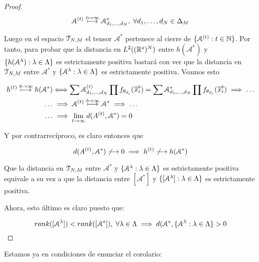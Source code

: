 \begin{proof}
    \begin{equation}
        \mathcal{A}^{(t)} \stackrel{t \mapsto \infty}{\longmapsto} \mathcal{A}^*_{d_1, \ldots, d_N},
        \; \forall d_1, \ldots, d_N \in \Delta_{M}
    \end{equation}

    Luego en el espacio $\mathcal{T}_{N, M}$ el tensor $\mathcal{A}^*$ pertenece al cierre de $\{ \mathcal{A}^{(t)}: t \in \mathbb{N} \}$. Por tanto, para probar que la distancia en $L^2((\mathbb{R}^s)^N)$ entre $h(\mathcal{A}^*)$ y $\{ h(\mathcal{A}^\lambda): \lambda \in \Lambda \}$ es estrictamente positiva bastará con ver que la distancia en $\mathcal{T}_{N, M}$ entre $\mathcal{A}^*$ y $\{ \mathcal{A}^\lambda: \lambda \in \Lambda \}$ es estrictamente positiva. Veamos esto

    \begin{equation}
    \begin{split}
        h^{(t)} \stackrel{t \mapsto \infty}{\longmapsto} h(\mathcal{A}^*) &\Longleftrightarrow \sum \mathcal{A}^{(t)}_{d_1, \ldots, d_N} \prod f_{\theta_{d_i}}(\overrightarrow{x_i}) = \sum \mathcal{A}^*_{d_1, \ldots, d_N} \prod f_{\theta_{d_i}}(\overrightarrow{x_i}) \implies \ldots \\
        \ldots &\implies \mathcal{A}^{(t)} \stackrel{t \mapsto \infty}{\longmapsto} \mathcal{A}^* \implies \ldots \\
        \ldots &\implies \lim_{t \to \infty} d(A^{(t)}, \mathcal{A}^*) = 0
    \end{split}
    \end{equation}

    Y por contrarrecíproco, es claro entonces que

    \begin{equation}
        d(A^{(t)}, \mathcal{A}^*) \not\longrightarrow 0 \implies h^{(t)} \not\longrightarrow h(\mathcal{A}^*)
    \end{equation}

    Que la distancia en $\mathcal{T}_{N, M}$ entre $\mathcal{A}^*$ y $\{ \mathcal{A}^\lambda: \lambda \in \Lambda \}$ es estrictamente positiva equivale a su vez a que la distancia entre $[\mathcal{A}^*]$ y $\{ [\mathcal{A}^\lambda]: \lambda \in \Lambda \}$ es estrictamente positiva.


    Ahora, esto último es claro puesto que:

    \begin{equation}
        rank([\mathcal{A}^\lambda]) < rank([\mathcal{A}^*]), \; \forall \lambda \in \Lambda \implies d(\mathcal{A}^*, \{ \mathcal{A}^\lambda: \lambda \in \Lambda \} > 0
    \end{equation}
\end{proof}

Estamos ya en condiciones de enunciar el corolario:

\begin{corolario}
\end{corolario}
